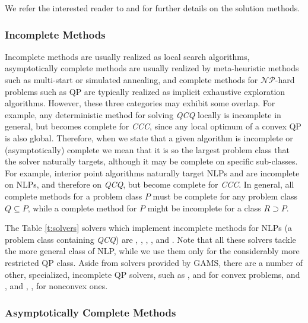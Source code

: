 {We refer the interested reader to 
\cite{book:2077007} and 
\cite{lee2006quadratic} for further details on the solution methods.}



\subsubsection{Incomplete Methods}

Incomplete methods are usually realized as local search algorithms, asymptotically complete methods are usually realized by meta-heuristic methods such as multi-start or simulated annealing, and complete methods for $\mathcal{NP}$-hard problems such as QP are typically realized as implicit exhaustive exploration algorithms. However, these three categories may exhibit some overlap. For example, any deterministic method for solving \textit{QCQ} locally is incomplete in general, but becomes complete for \textit{CCC}, since any local optimum of a convex QP is also global. Therefore, when we state that a given algorithm is incomplete or (asymptotically) complete we mean that it is so the largest problem class that the solver naturally targets, although it may be complete on specific sub-classes. For example, interior point algorithms naturally target NLPs and are incomplete on NLPs, and therefore on \textit{QCQ}, but become complete for \textit{CCC}. In general, all complete methods for a problem class $P$ must be complete for any problem class $Q \subseteq P$, while a complete method for $P$ might be incomplete for a class $R \supset P$.

The Table \ref{t:solvers} solvers which implement incomplete methods for NLPs (a problem class containing \textit{QCQ}) are \conopt, \ipopt, \minos, \snopt, and \knitro. Note that all these solvers tackle the more general class of NLP, while we use them only for the considerably more restricted QP class. Aside from solvers provided by GAMS, there are a number of other, specialized, incomplete QP solvers, such as
\cqp \cite{GoulOrbaRobi13:mpc},
\dqp \cite{GoulRobi16:coap} and
\ooqp \cite{GertWrig03:toms}
for convex problems, and
\bqpd \cite{Flet:2000},
\qpa \cite{GoulToin02i} and
\qpb \cite{ConnGoulOrbaToin:2000},
\qpc \cite{GoulOrbaToin03:toms},
\sqic \cite{Gill2015}
for nonconvex ones.

\subsubsection{Asymptotically Complete Methods}\label{sss:asymc}

